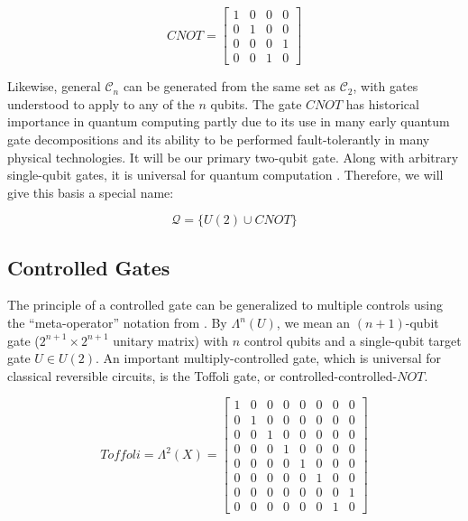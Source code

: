 \begin{equation}
CNOT = 
 \left[
  \begin{array}{cccc}
    1 & 0 & 0 & 0 \\
    0 & 1 & 0 & 0 \\
    0 & 0 & 0 & 1 \\
    0 & 0 & 1 & 0
  \end{array} \right]
\end{equation}

Likewise, general $\mathcal{C}_n$ can be generated from the same set
as $\mathcal{C}_2$, with gates understood to apply to any of the $n$ qubits.
The gate $CNOT$ has historical importance in quantum computing partly
due to its use in many
early quantum gate decompositions and its ability to
be performed fault-tolerantly in many physical technologies. It will be our
primary two-qubit gate.
Along with arbitrary single-qubit gates, it is universal for quantum computation \cite{Barenco1995a}.
Therefore, we will give this basis a special name:

\begin{equation}
\mathcal{Q} = \{ U(2) \cup CNOT \}
\end{equation}

\subsection{Controlled Gates}
\label{subsec:controlled}

The principle of a controlled gate can be generalized to multiple
controls using the ``meta-operator'' notation from \cite{Kitaev2002}.
By $\Lambda^n(U)$, we mean an $(n+1)$-qubit gate ($2^{n+1} \times 2^{n+1}$
unitary matrix) with $n$ control qubits and a single-qubit target gate
$U \in U(2)$. An important multiply-controlled gate, which is universal
for classical reversible circuits, is the Toffoli gate, or controlled-controlled-$NOT$.

\begin{equation}
Toffoli = \Lambda^2(X) = 
 \left[
  \begin{array}{cccccccc}
    1 & 0 & 0 & 0 & 0 & 0 & 0 & 0 \\
    0 & 1 & 0 & 0 & 0 & 0 & 0 & 0 \\
    0 & 0 & 1 & 0 & 0 & 0 & 0 & 0 \\
    0 & 0 & 0 & 1 & 0 & 0 & 0 & 0 \\
    0 & 0 & 0 & 0 & 1 & 0 & 0 & 0 \\
    0 & 0 & 0 & 0 & 0 & 1 & 0 & 0 \\
    0 & 0 & 0 & 0 & 0 & 0 & 0 & 1 \\
    0 & 0 & 0 & 0 & 0 & 0 & 1 & 0
  \end{array} \right]
\end{equation}

